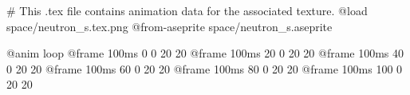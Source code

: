 # This .tex file contains animation data for the associated texture.
@load space/neutron_s.tex.png
@from-aseprite space/neutron_s.aseprite

@anim loop
	@frame 100ms 0 0 20 20
	@frame 100ms 20 0 20 20
	@frame 100ms 40 0 20 20
	@frame 100ms 60 0 20 20
	@frame 100ms 80 0 20 20
	@frame 100ms 100 0 20 20
